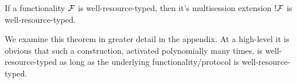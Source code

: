 %

\begin{theorem}[PPT !]\label{thm:bangppt}
If a functionality $\mathcal{F}$ is well-resource-typed, then it's multisession extension $!\mathcal{F}$ is well-resource-typed.
\end{theorem}

We examine this theorem in greater detail in the appendix. 
At a high-level it is obvious that such a construction, activated polynomially many times, is well-resource-typed as long as the underlying functionality/protocol is well-resource-typed.
%



